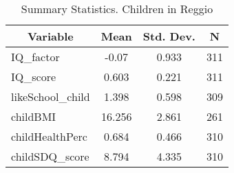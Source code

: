 
\begin{table}[htbp]\centering \caption{Summary Statistics. Children in Reggio \label{cityChildReggio}}
\begin{tabular}{l c c  c}\hline\hline
\multicolumn{1}{c}{\textbf{Variable}} & \textbf{Mean}
 & \textbf{Std. Dev.} & \textbf{N}\\ \hline
IQ\_factor & -0.07 & 0.933  & 311\\
IQ\_score & 0.603 & 0.221  & 311\\
likeSchool\_child & 1.398 & 0.598  & 309\\
childBMI & 16.256 & 2.861  & 261\\
childHealthPerc & 0.684 & 0.466  & 310\\
childSDQ\_score & 8.794 & 4.335  & 310\\
\hline\end{tabular}
\end{table}
